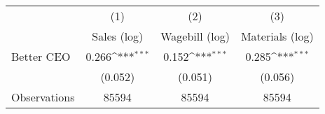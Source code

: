 {
\def\sym#1{\ifmmode^{#1}\else\(^{#1}\)\fi}
\begin{tabular}{l*{3}{c}}
\hline\hline
                    &\multicolumn{1}{c}{(1)}&\multicolumn{1}{c}{(2)}&\multicolumn{1}{c}{(3)}\\
                    &\multicolumn{1}{c}{Sales (log)}&\multicolumn{1}{c}{Wagebill (log)}&\multicolumn{1}{c}{Materials (log)}\\
\hline
Better CEO          &       0.266\sym{***}&       0.152\sym{***}&       0.285\sym{***}\\
                    &     (0.052)         &     (0.051)         &     (0.056)         \\
\hline
Observations        &       85594         &       85594         &       85594         \\
\hline\hline
\end{tabular}
}
